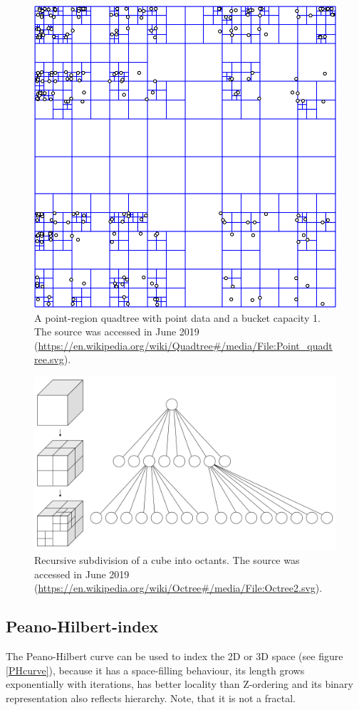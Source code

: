 \documentclass[12pt]{article}
\theoremstyle{plain}
\begin{document}
\begin{figure}[h!]
    \centering
	\includegraphics[width=.625\linewidth]{media/800px-Point_quadtree.png}
	\caption{A point-region quadtree with point data and a bucket capacity 1. The source was accessed in June 2019 (\url{https://en.wikipedia.org/wiki/Quadtree\#/media/File:Point_quadtree.svg}).}
	\label{quadtree}
\end{figure}

\begin{figure}[h!]
    \centering
	\includegraphics[width=.625\linewidth]{media/Octree2.png}
	\caption{Recursive subdivision of a cube into octants. The source was accessed in June 2019 (\url{https://en.wikipedia.org/wiki/Octree\#/media/File:Octree2.svg}).}
	\label{octree}
\end{figure}

\newpage

\subsection{Peano-Hilbert-index}

The Peano-Hilbert curve can be used to index the 2D or 3D space (see figure \ref{PHcurve}), because it has a space-filling behaviour, its length grows exponentially with iterations, has better locality than Z-ordering and its binary representation also reflects hierarchy. Note, that it is not a fractal. 
\end{document}
